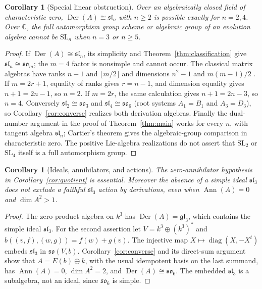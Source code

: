 \documentclass[11pt]{article}
\newtheorem{corollary}[theorem]{Corollary}
\DeclareMathOperator{\Der}{Der}
\DeclareMathOperator{\Ann}{Ann}
\newcommand{\so}{\mathfrak{so}}
\newcommand{\slie}{\mathfrak{sl}}
\newcommand{\C}{\mathbb C}
\begin{document}
\begin{corollary}[Special linear obstruction]\label{cor:speciallinear}
Over an algebraically closed field of characteristic zero,
$\Der(A)\cong\slie_n$ with $n\ge2$ is possible exactly for $n=2,4$.
Over $\C$, the full automorphism group scheme or algebraic group of an
evolution algebra cannot be $\mathrm{SL}_n$ when $n=3$ or $n\ge5$.
\end{corollary}
\begin{proof}
If $\Der(A)\cong\slie_n$, its simplicity and
Theorem~\ref{thm:classification} give $\slie_n\cong\so_m$;
the $m=4$ factor is nonsimple and cannot occur.
The classical matrix algebras have ranks $n-1$ and $\lfloor m/2\rfloor$
and dimensions $n^2-1$ and $m(m-1)/2$
\cite[Chapter~I, \S8, classical examples, pp.~92--96]{lag}.
If $m=2r+1$, equality of ranks gives $r=n-1$, and dimension equality
gives $n+1=2n-1$, so $n=2$. If $m=2r$, the same calculation gives
$n+1=2n-3$, so $n=4$.
Conversely $\slie_2\cong\so_3$ and $\slie_4\cong\so_6$
(root systems $A_1=B_1$ and $A_3=D_3$), so
Corollary~\ref{cor:converse} realizes both derivation algebras.
Finally the dual-number argument in the proof of Theorem~\ref{thm:main}
works for every $n$, with tangent algebra $\slie_n$; Cartier's theorem
gives the algebraic-group comparison in characteristic zero.
The positive Lie-algebra realizations do not assert that
$\mathrm{SL}_2$ or $\mathrm{SL}_4$ itself is a full automorphism group.
\end{proof}

\begin{corollary}[Ideals, annihilators, and actions]\label{cor:distinction}
The zero-annihilator hypothesis in Corollary~\ref{cor:quotient} is
essential. Moreover the absence of a simple ideal $\slie_3$ does not
exclude a faithful $\slie_3$ action by derivations, even when
$\Ann(A)=0$ and $\dim A^2>1$.
\end{corollary}
\begin{proof}
The zero-product algebra on $k^3$ has $\Der(A)=\mathfrak{gl}_3$,
which contains the simple ideal $\slie_3$.
For the second assertion let $V=k^3\oplus(k^3)^*$ and
$b((v,f),(w,g))=f(w)+g(v)$. The injective map
$X\mapsto\operatorname{diag}(X,-X^t)$ embeds $\slie_3$ in $\so(V,b)$.
Corollary~\ref{cor:converse} and its direct-sum argument show that
$A=E(b)\oplus k$, with the usual idempotent basis on the last summand,
has $\Ann(A)=0$, $\dim A^2=2$, and $\Der(A)\cong\so_6$.
The embedded $\slie_3$ is a subalgebra, not an ideal, since $\so_6$ is simple.
\end{proof}
\end{document}
